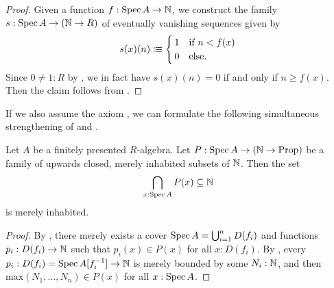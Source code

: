 \begin{proof}
  Given a function $f : \operatorname{Spec} A \to \mathbb{N}$,
  we construct the family $s : \operatorname{Spec} A \to (\mathbb{N} \to R)$
  of eventually vanishing sequences
  given by
  \[
    s(x)(n) \colonequiv
    \begin{cases}
      \,1 &\text{if $n < f(x)$}\\
      \,0 &\text{else} \rlap{.}
    \end{cases}
  \]
  Since $0 \neq 1 : R$ by ,
  we in fact have $s(x)(n) = 0$ if and only if $n \geq f(x)$.
  Then the claim follows from .
\end{proof}

If we also assume the axiom ,
we can formulate the following simultaneous strengthening
of 
and .

\begin{proposition}%
  \label{strengthened-boundedness}
  Let $A$ be a finitely presented $R$-algebra.
  Let $P : \operatorname{Spec} A \to (\mathbb{N} \to \mathrm{Prop})$
  be a family of upwards closed, merely inhabited subsets of $\mathbb{N}$.
  Then the set
  \[ \bigcap_{x : \operatorname{Spec} A} P(x) \subseteq \mathbb{N} \]
  is merely inhabited.
\end{proposition}

\begin{proof}
  By ,
  there merely exists a cover
  $\operatorname{Spec} A = \bigcup_{i = 1}^n D(f_i)$
  and functions $p_i : D(f_i) \to \mathbb{N}$
  such that $p_i(x) \in P(x)$ for all $x : D(f_i)$.
  By ,
  every $p_i : D(f_i) = \operatorname{Spec} A[f_i^{-1}] \to \mathbb{N}$
  is merely bounded by some $N_i : \mathbb{N}$,
  and then $\mathrm{max}(N_1, \dots, N_n) \in P(x)$ for all $x : \operatorname{Spec} A$.
\end{proof}
